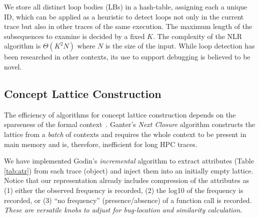 %

We store all distinct loop bodies (LBs)
in a hash-table, assigning each a unique ID, which can be applied as
a heuristic to detect loops not only in the current trace but also in other
traces of the same execution.
%
The maximum length of the subsequences to examine is decided by a fixed $K$.
%
The complexity of the NLR algorithm is $\Theta(K^2N)$ where $N$ is the size of the input. 
%
While loop detection has been researched in other contexts,
its use to support debugging is believed to be novel.

\subsection{Concept Lattice Construction}
\label{subsec:algo-cl}

%
The efficiency of algorithms for concept lattice construction
depends on the sparseness of the formal context~\cite{clgenperform}.
%
%
Ganter's \textit{Next Closure} algorithm \cite{clbook}
constructs the lattice from a
\textit{batch} of contexts and requires the whole context to be present in main memory and is, therefore, inefficient for long HPC traces.
%
%

%
We have implemented Godin's \textit{incremental} algorithm \cite{clconst}
to extract attributes (Table \ref{tab:atr})
from each trace (object) and inject them into an initially empty lattice.
%
Notice that our representation already includes compression of the attributes as (1) either the
observed frequency is recorded, (2) the log10 of the frequency is recorded, or (3) ``no frequency''
(presence/absence) of a function call is recorded.
%
{\em These are versatile knobs to adjust for bug-location and similarity calculation}.
  

